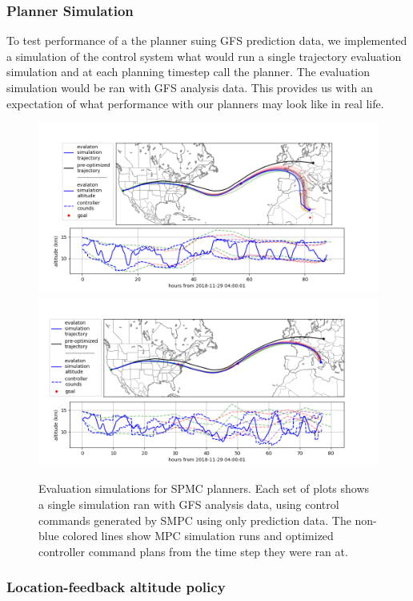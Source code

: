 \documentclass[11pt]{scrartcl} %
\begin{document}
\subsubsection{Planner Simulation}
To test performance of a the planner suing GFS prediction data, we implemented a simulation of the control system what would run a single trajectory evaluation simulation and at each planning timestep call the planner. The evaluation simulation would be ran with GFS analysis data. This provides us with an expectation of what performance with our planners may look like in real life.
\begin{figure}[h!]
\includegraphics[width=\linewidth]{../../figs/mpc/mpc1.png}
\includegraphics[width=\linewidth]{../../figs/mpc/mpc2.png}
\caption{Evaluation simulations for SPMC planners. Each set of plots shows a single simulation ran with GFS analysis data, using control commands generated by SMPC using only prediction data. The non-blue colored lines show MPC simulation runs and optimized controller command plans from the time step they were ran at.}
\label{mcp}
\end{figure}


\subsubsection{Location-feedback altitude policy}
\end{document}
